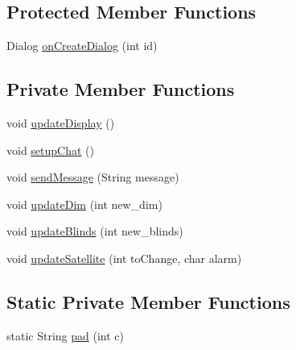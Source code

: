 \subsection*{Protected Member Functions}
\begin{DoxyCompactItemize}
\item 
Dialog \hyperlink{classcom_1_1example_1_1android_1_1_bluetooth_chat_1_1_l_a_s_a_r_control_a3c6dd4273e9b563fbffdd8bad1cc6cf2}{on\-Create\-Dialog} (int id)
\end{DoxyCompactItemize}
\subsection*{Private Member Functions}
\begin{DoxyCompactItemize}
\item 
void \hyperlink{classcom_1_1example_1_1android_1_1_bluetooth_chat_1_1_l_a_s_a_r_control_ab7eb3c8c2e8604801ee00f11d3af8c3f}{update\-Display} ()
\item 
void \hyperlink{classcom_1_1example_1_1android_1_1_bluetooth_chat_1_1_l_a_s_a_r_control_a5bb861876066eec2e7de8212bc5312b5}{setup\-Chat} ()
\item 
void \hyperlink{classcom_1_1example_1_1android_1_1_bluetooth_chat_1_1_l_a_s_a_r_control_a6a8a2004434afabb628a490d0d5273f9}{send\-Message} (String message)
\item 
void \hyperlink{classcom_1_1example_1_1android_1_1_bluetooth_chat_1_1_l_a_s_a_r_control_ab4704f4dc963fbe366442390a52df041}{update\-Dim} (int new\-\_\-dim)
\item 
void \hyperlink{classcom_1_1example_1_1android_1_1_bluetooth_chat_1_1_l_a_s_a_r_control_a6901587f25cd87fc5b259ac4685dff18}{update\-Blinds} (int new\-\_\-blinds)
\item 
void \hyperlink{classcom_1_1example_1_1android_1_1_bluetooth_chat_1_1_l_a_s_a_r_control_ab084bbab05e4d41e495608164e6bd56c}{update\-Satellite} (int to\-Change, char alarm)
\end{DoxyCompactItemize}
\subsection*{Static Private Member Functions}
\begin{DoxyCompactItemize}
\item 
static String \hyperlink{classcom_1_1example_1_1android_1_1_bluetooth_chat_1_1_l_a_s_a_r_control_ad6e6064f6c7bf4149b827c8882acc43c}{pad} (int c)
\end{DoxyCompactItemize}

